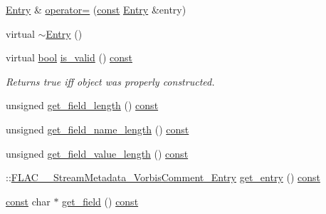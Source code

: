 \begin{DoxyCompactItemize}
\hyperlink{class_f_l_a_c_1_1_metadata_1_1_vorbis_comment_1_1_entry}{Entry} \& \hyperlink{class_f_l_a_c_1_1_metadata_1_1_vorbis_comment_1_1_entry_aa8695c767d1e6110e32befcf2353e2ed}{operator=} (\hyperlink{getopt1_8c_a2c212835823e3c54a8ab6d95c652660e}{const} \hyperlink{class_f_l_a_c_1_1_metadata_1_1_vorbis_comment_1_1_entry}{Entry} \&entry)
\item 
virtual \hyperlink{class_f_l_a_c_1_1_metadata_1_1_vorbis_comment_1_1_entry_add46ffd3c31188b7498a075e475bb54b}{$\sim$\+Entry} ()
\item 
virtual \hyperlink{mac_2config_2i386_2lib-src_2libsoxr_2soxr-config_8h_abb452686968e48b67397da5f97445f5b}{bool} \hyperlink{class_f_l_a_c_1_1_metadata_1_1_vorbis_comment_1_1_entry_a202f4e8b418fd3cc4c4acffff4fc17ff}{is\+\_\+valid} () \hyperlink{getopt1_8c_a2c212835823e3c54a8ab6d95c652660e}{const} 
\begin{DoxyCompactList}\small\item\em Returns {\ttfamily true} iff object was properly constructed. \end{DoxyCompactList}\item 
unsigned \hyperlink{class_f_l_a_c_1_1_metadata_1_1_vorbis_comment_1_1_entry_a29bdeb2eb58d106dee5ee6d659c311e9}{get\+\_\+field\+\_\+length} () \hyperlink{getopt1_8c_a2c212835823e3c54a8ab6d95c652660e}{const} 
\item 
unsigned \hyperlink{class_f_l_a_c_1_1_metadata_1_1_vorbis_comment_1_1_entry_aa34dc25ab7d5ad2116e6fa1559c378e5}{get\+\_\+field\+\_\+name\+\_\+length} () \hyperlink{getopt1_8c_a2c212835823e3c54a8ab6d95c652660e}{const} 
\item 
unsigned \hyperlink{class_f_l_a_c_1_1_metadata_1_1_vorbis_comment_1_1_entry_a99284b76a89b347328a5202efa88ea86}{get\+\_\+field\+\_\+value\+\_\+length} () \hyperlink{getopt1_8c_a2c212835823e3c54a8ab6d95c652660e}{const} 
\item 
\+::\hyperlink{struct_f_l_a_c_____stream_metadata___vorbis_comment___entry}{F\+L\+A\+C\+\_\+\+\_\+\+Stream\+Metadata\+\_\+\+Vorbis\+Comment\+\_\+\+Entry} \hyperlink{class_f_l_a_c_1_1_metadata_1_1_vorbis_comment_1_1_entry_af82ae544ebd6ac2df97c359672d4a956}{get\+\_\+entry} () \hyperlink{getopt1_8c_a2c212835823e3c54a8ab6d95c652660e}{const} 
\item 
\hyperlink{getopt1_8c_a2c212835823e3c54a8ab6d95c652660e}{const} char $\ast$ \hyperlink{class_f_l_a_c_1_1_metadata_1_1_vorbis_comment_1_1_entry_a1c2893d8edc37498fb57dcb1ae003cbb}{get\+\_\+field} () \hyperlink{getopt1_8c_a2c212835823e3c54a8ab6d95c652660e}{const} 
\item 

\end{DoxyCompactItemize}
